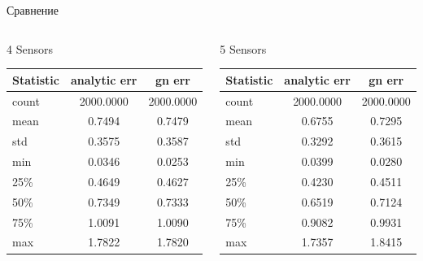 \documentclass[xcolor=table,10pt]{beamer}
\begin{document}
\begin{frame}{Сравнение}

\begin{columns}[c]

\begin{block}{4 Sensors}
\centering
\footnotesize
\begin{tabular}{lcc}
\toprule
Statistic & analytic err & gn err \\
\midrule
count & 2000.0000 & 2000.0000 \\
mean & 0.7494 & 0.7479 \\
std & 0.3575 & 0.3587 \\
min & 0.0346 & 0.0253 \\
25\% & 0.4649 & 0.4627 \\
50\% & 0.7349 & 0.7333 \\
75\% & 1.0091 & 1.0090 \\
max & 1.7822 & 1.7820 \\
\bottomrule
\end{tabular}
\end{block}

\begin{block}{5 Sensors}
\centering
\footnotesize
\begin{tabular}{lcc}
\toprule
Statistic & analytic err & gn err \\
\midrule
count & 2000.0000 & 2000.0000 \\
mean & 0.6755 & 0.7295 \\
std & 0.3292 & 0.3615 \\
min & 0.0399 & 0.0280 \\
25\% & 0.4230 & 0.4511 \\
50\% & 0.6519 & 0.7124 \\
75\% & 0.9082 & 0.9931 \\
max & 1.7357 & 1.8415 \\
\bottomrule
\end{tabular}
\end{block}

\end{columns}

\end{frame}
\end{document}

